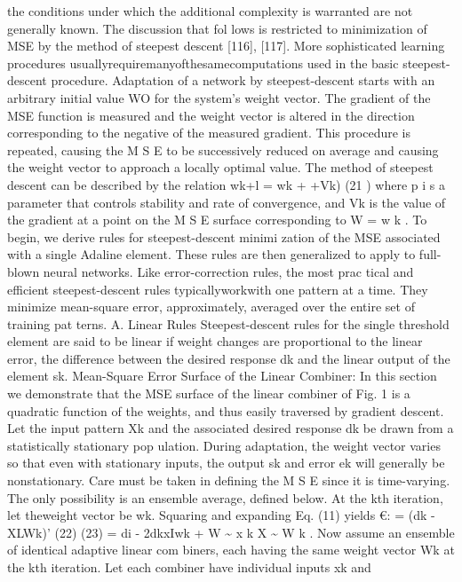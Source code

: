 \documentclass[11pt,a4paper,twocolumn]{article}
\begin{document}
{the conditions under which the additional complexity is 
warranted are not generally known. The discussion that fol
lows is restricted to minimization of MSE by the method of 
steepest descent [116], [117]. More sophisticated learning 
procedures usuallyrequiremanyofthesamecomputations 
used in the basic steepest-descent procedure. 
Adaptation of a network by steepest-descent starts with 
an arbitrary initial value WO for the system’s weight vector. 
The gradient of the MSE function is measured and the 
weight vector is altered in the direction corresponding to 
the negative of the measured gradient. This procedure is 
repeated, causing the M S E  to be successively reduced on 
average and causing the weight vector to approach a locally 
optimal value. 
The method of steepest descent can be described by the 
relation 
wk+l = wk + +Vk) 
(21 ) 
where p i s  a parameter that controls stability and rate of 
convergence, and Vk is the value of the gradient at a point 
on the M S E  surface corresponding to W = w k .  
To begin, we derive rules for steepest-descent minimi
zation of the MSE associated with a single Adaline element. 
These rules are then generalized to apply to full-blown 
neural networks. Like error-correction rules, the most prac
tical and efficient steepest-descent rules typicallyworkwith 
one pattern at a time. They minimize mean-square error, 
approximately, averaged over the entire set of training pat
terns. 
A. Linear Rules 
Steepest-descent rules for the single threshold element 
are said to be linear if weight changes are proportional to 
the linear error, the difference between the desired 
response dk and the linear output of the element sk. 
Mean-Square Error Surface of the Linear Combiner: In this 
section we demonstrate that the MSE surface of the linear 
combiner of Fig. 1 is a quadratic function of the weights, 
and thus easily traversed by gradient descent. 
Let the input pattern Xk and the associated desired 
response dk be drawn from a statistically stationary pop
ulation. During adaptation, the weight vector varies so that 
even with stationary inputs, the output sk and error ek will 
generally be nonstationary. Care must be taken in defining 
the M S E  since it is time-varying. The only possibility is an 
ensemble average, defined below. 
At the kth iteration, let theweight vector be wk. Squaring 
and expanding Eq. (11) yields 
€: 
= (dk - XLWk)’ 
(22) 
(23) 
= di - 2dkxIwk + W \~{} x k X \~{} W k .  
Now assume an ensemble of identical adaptive linear com
biners, each having the same weight vector Wk at the kth 
iteration. Let each combiner have individual inputs xk and 
}
\end{document}
